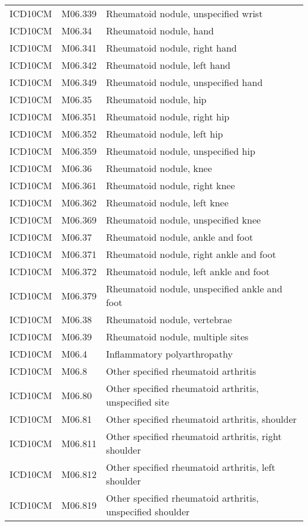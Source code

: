 \begin{longtable}{p{}p{}p{}}
  ICD10CM & M06.339 & Rheumatoid nodule, unspecified wrist \\ 
  ICD10CM & M06.34 & Rheumatoid nodule, hand \\ 
  ICD10CM & M06.341 & Rheumatoid nodule, right hand \\ 
  ICD10CM & M06.342 & Rheumatoid nodule, left hand \\ 
  ICD10CM & M06.349 & Rheumatoid nodule, unspecified hand \\ 
  ICD10CM & M06.35 & Rheumatoid nodule, hip \\ 
  ICD10CM & M06.351 & Rheumatoid nodule, right hip \\ 
  ICD10CM & M06.352 & Rheumatoid nodule, left hip \\ 
  ICD10CM & M06.359 & Rheumatoid nodule, unspecified hip \\ 
  ICD10CM & M06.36 & Rheumatoid nodule, knee \\ 
  ICD10CM & M06.361 & Rheumatoid nodule, right knee \\ 
  ICD10CM & M06.362 & Rheumatoid nodule, left knee \\ 
  ICD10CM & M06.369 & Rheumatoid nodule, unspecified knee \\ 
  ICD10CM & M06.37 & Rheumatoid nodule, ankle and foot \\ 
  ICD10CM & M06.371 & Rheumatoid nodule, right ankle and foot \\ 
  ICD10CM & M06.372 & Rheumatoid nodule, left ankle and foot \\ 
  ICD10CM & M06.379 & Rheumatoid nodule, unspecified ankle and foot \\ 
  ICD10CM & M06.38 & Rheumatoid nodule, vertebrae \\ 
  ICD10CM & M06.39 & Rheumatoid nodule, multiple sites \\ 
  ICD10CM & M06.4 & Inflammatory polyarthropathy \\ 
  ICD10CM & M06.8 & Other specified rheumatoid arthritis \\ 
  ICD10CM & M06.80 & Other specified rheumatoid arthritis, unspecified site \\ 
  ICD10CM & M06.81 & Other specified rheumatoid arthritis, shoulder \\ 
  ICD10CM & M06.811 & Other specified rheumatoid arthritis, right shoulder \\ 
  ICD10CM & M06.812 & Other specified rheumatoid arthritis, left shoulder \\ 
  ICD10CM & M06.819 & Other specified rheumatoid arthritis, unspecified shoulder \\ 

\end{longtable}
